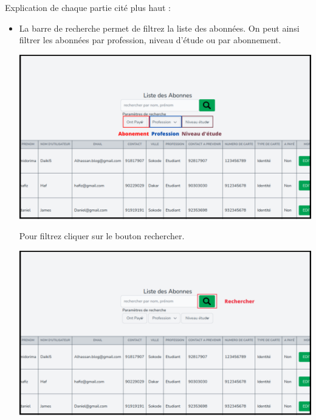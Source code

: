 \documentclass[12pt,a4paper]{article}
\begin{document}
Explication de chaque partie cité plus haut : 
\begin{itemize}
\item La barre de recherche permet de filtrez la liste des abonnées. On peut ainsi filtrer 
les abonnées par profession, niveau d'étude ou par abonnement.\\

\begin{center}
\includegraphics[scale=0.3]{img/abonne_search.png}
\end{center}

Pour filtrez cliquer sur le bouton rechercher.

\begin{center}
\includegraphics[scale=0.3]{img/abonne_search_button.png}
\end{center}


\end{itemize}
\end{document}

